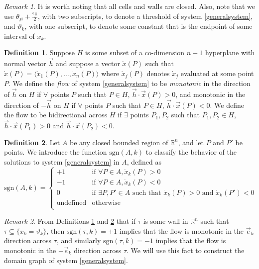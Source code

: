 \documentclass[12pt]{article}
\theoremstyle{definition}
\newtheorem{defn}{Definition}[section]
\theoremstyle{remark}
\newtheorem{remark}{Remark}[section]
\newcommand\sgn{\text{sgn}}
\newcommand{\bbR}{\mathbb{R}} %
\begin{document}
\begin{remark}
It is worth noting that all cells and walls are closed. Also, note that we use $\theta_{ji}+\frac{\epsilon_{ji}}{2}$, with two subscripts, to denote a threshold of system \eqref{generalsystem}, and $\vartheta_k$, with one subscript, to denote some constant that is the endpoint of some interval of $x_k$.
\end{remark}

\begin{defn} \label{flowDefn}
Suppose $H$ is some subset of a co-dimension $n-1$ hyperplane with normal vector $\vec{h}$ and suppose a vector $\dot{x}(P)$ such that $\dot{x}(P)=\langle \dot{x}_1(P),\dots,\dot{x}_n(P) \rangle$ where $\dot{x}_j(P)$ denotes $\dot{x}_j$ evaluated at some point $P$. We define the \textit{flow} of system \eqref{generalsystem} to be \textit{monotonic} in the direction of $\vec{h}$ on $H$ if $\forall$ points $P$ such that $P\in H$, $\vec{h}\cdot\vec{x}(P)>0$, and monotonic in the direction of $-\vec{h}$ on $H$ if $\forall$ points $P$ such that $P\in H$, $\vec{h}\cdot\vec{x}(P)<0$. 
We define the flow to be bidirectional across $H$ if $\exists$ points $P_1,P_2$ such that $P_1,P_2 \in H$, $\vec{h}\cdot\vec{x}(P_1)>0$ and $\vec{h}\cdot\vec{x}(P_2)<0$.
\end{defn}

\begin{defn} \label{sgnDefn}
Let $A$ be any closed bounded region of $\bbR^n$, and let $P$ and $P'$ be points.  We introduce the function $\sgn(A,k)$ to classify the behavior of the solutions to system \eqref{generalsystem} in $A$, defined as 
\begin{equation}
\sgn(A,k)=
\begin{cases}
+1	&	\text{if } \forall P\in A, \dot x_k (P)>0\\
-1	&	\text{if } \forall P\in A, \dot x_k (P)<0\\
0	&	\text{if } \exists P,P'\in A \text{ such that }  \dot x_k (P)>0 \text{ and } \dot x_k (P')<0\\
\text{undefined} & \text{otherwise} \\
\end{cases}
\end{equation}
\end{defn}

\begin{remark}
From Definitions \ref{flowDefn} and \ref{sgnDefn} that if $\tau$ is some wall in $\mathbb{R}^n$ such that $\tau \subseteq \{x_k=\vartheta_k\}$, then $\sgn(\tau,k)=+1$ implies that the flow is monotonic in the $\vec e_k$ direction across $\tau$, and similarly $\sgn(\tau,k)=-1$ implies that the flow is monotonic in the $-\vec e_k$ direction across $\tau$. 
We will use this fact to construct the domain graph of system \eqref{generalsystem}.
\end{remark}
\end{document}

